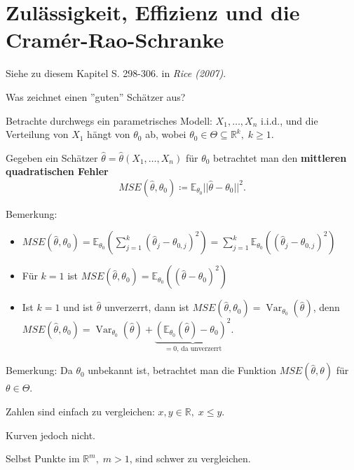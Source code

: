 \documentclass{tstextbook}
\DeclareMathOperator{\Var}{Var}
\newcommand{\E}{\mathbb E}
\newcommand{\R}{\mathbb R}
\begin{document}
\section{Zulässigkeit, Effizienz und die Cramér-Rao-Schranke}

\begin{book}
	Siehe zu diesem Kapitel S. 298-306. in	\textit{Rice (2007)}.
\end{book}

Was zeichnet einen ''guten'' Schätzer aus?

Betrachte durchwegs ein parametrisches Modell:
$ X_1,\ldots,X_n $ i.i.d., und die Verteilung von $ X_1 $ hängt von $ \theta_0 $ ab, wobei $ \theta_0 \in \Theta \subseteq \R^k, \; k \ge 1 $.

Gegeben ein Schätzer $ \hat{\theta} = \hat{\theta}(X_1, \ldots, X_n) $ für $ \theta_0 $ betrachtet man den \textbf{mittleren quadratischen Fehler}  
	\[
	MSE\left(\hat{\theta},\theta_0\right) \coloneqq \E_{\theta_0} ||\hat{\theta}-\theta_0||^2.
	\]

\begin{remark}
	Bemerkung:
	\begin{itemize}
		\item $ MSE\left(\hat{\theta}, \theta_0\right) = \E_{\theta_0} \left(\sum_{j=1}^{k}\left(\hat{\theta}_j -\theta_{0,j}\right)^2\right) = \sum_{j=1}^{k} \E_{\theta_0}\left(\left(\hat{\theta}_j -\theta_{0,j}\right)^2\right)$
		\item Für $ k=1 $ ist $ MSE\left(\hat{\theta}, \theta_0\right) = \E_{\theta_0}\left(\left(\hat{\theta} -\theta_{0}\right)^2\right)$
		\item Ist $ k=1 $ und ist $ \hat{\theta} $ unverzerrt, dann ist $ MSE\left(\hat{\theta}, \theta_0\right) = \Var_{\theta_0}\left(\hat{\theta}\right) $, denn $ MSE\left(\hat{\theta}, \theta_0\right) = \Var_{\theta_0}\left(\hat{\theta}\right) + \underbrace{\left(\E_{\theta_0}(\hat{\theta})-\theta_0\right)^2}_{=0 \text{, da unverzerrt}} $.
	\end{itemize}
\end{remark}

\begin{remark}
	Bemerkung: Da $ \theta_0 $ unbekannt ist, betrachtet man die Funktion $ MSE\left(\hat{\theta}, \theta\right) $ für $ \theta\in\Theta $. 
	
	Zahlen sind einfach zu vergleichen: $ x,y \in \R, \; x\le y $. 
	
	Kurven jedoch nicht. 
	
	Selbst Punkte im $ \R^m,\; m>1 $, sind schwer zu vergleichen.
\end{remark}
\end{document}
